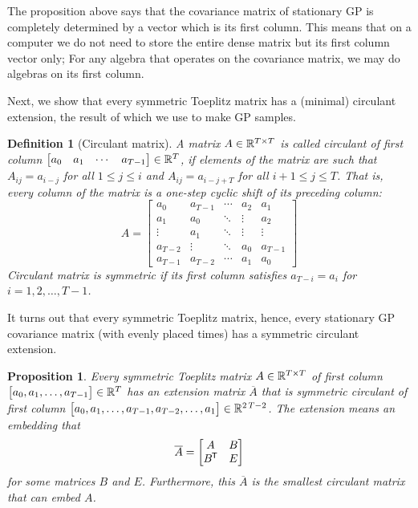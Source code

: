 \documentclass[]{article}
\newtheorem{proposition}[theorem]{Proposition}
\newtheorem{definition}[theorem]{Definition}
\begin{document}
The proposition above says that the covariance matrix of stationary GP is completely determined by a vector which is its first column. This means that on a computer we do not need to store the entire dense matrix but its first column vector only; For any algebra that operates on the covariance matrix, we may do algebras on its first column. 

Next, we show that every symmetric Toeplitz matrix has a (minimal) circulant extension, the result of which we use to make GP samples. 

\begin{definition}[Circulant matrix]
	A matrix $A\in\mathbb{R}^{T\times T}$ is called circulant of first column $\begin{bmatrix} a_0 & a_1 & \cdots & a_{T-1} \end{bmatrix} \in\mathbb{R}^T$, if elements of the matrix are such that $A_{ij} = a_{i-j}$ for all $1\leq j\leq i$ and $A_{ij}=a_{i-j+T}$ for all $i+1\leq j\leq T$. That is, every column of the matrix is a one-step cyclic shift of its preceding column:
	\begin{equation*}
		A = 
		\begin{bmatrix}
			a_0 & a_{T-1} & \cdots & a_2 & a_1 \\
			a_1 & a_0 & \ddots & \vdots & a_2 \\
			\vdots & a_1 & \ddots & \vdots & \vdots \\
			a_{T-2} & \vdots & \ddots & a_0 & a_{T-1} \\
			a_{T-1} & a_{T-2} & \cdots & a_1 & a_0
		\end{bmatrix}
	\end{equation*}
	Circulant matrix is symmetric if its first column satisfies $a_{T-i} = a_i$ for $i=1,2,\ldots,T-1$.
\end{definition}

It turns out that every symmetric Toeplitz matrix, hence, every stationary GP covariance matrix (with evenly placed times) has a symmetric circulant extension.

\begin{proposition}
	\label{prop:first-col-ext}
	Every symmetric Toeplitz matrix $A\in\mathbb{R}^{T\times T}$ of first column $\begin{bmatrix} a_0, a_1, \ldots, a_{T-1} \end{bmatrix} \in \mathbb{R}^T$ has an extension matrix $\overline{A}$ that is symmetric circulant of first column $\begin{bmatrix} a_0, a_1, \ldots, a_{T-1}, a_{T-2}, \ldots, a_{1}\end{bmatrix} \in \mathbb{R}^{2 \, T - 2}$. The extension means an embedding that
	\begin{equation*}
		\overline{A} = 
		\begin{bmatrix}
			A & B \\
			B^{\mkern-1.5mu\mathsf{T}} & E
		\end{bmatrix}
	\end{equation*}
	for some matrices $B$ and $E$. Furthermore, this $\overline{A}$ is the smallest circulant matrix that can embed $A$.
\end{proposition}
\end{document}
